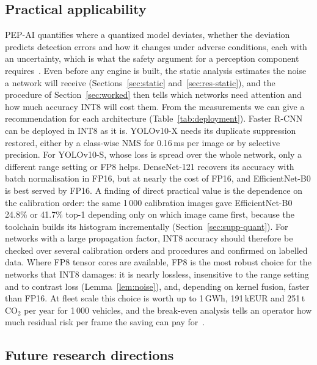 \documentclass[pdflatex,sn-mathphys-num]{sn-jnl}%
\theoremstyle{thmstyleone}%
\theoremstyle{thmstyletwo}%
\theoremstyle{thmstylethree}%
\begin{document}
\subsection{Practical applicability}

PEP-AI quantifies where a quantized model deviates, whether the deviation predicts detection errors and how it changes under adverse conditions, each with an uncertainty, which is what the safety argument for a perception component requires~\cite{iso21448,iso8800}. Even before any engine is built, the static analysis estimates the noise a network will receive (Sections~\ref{sec:static} and~\ref{sec:res-static}), and the procedure of Section~\ref{sec:worked} then tells which networks need attention and how much accuracy INT8 will cost them. From the measurements we can give a recommendation for each architecture (Table~\ref{tab:deployment}). Faster R-CNN can be deployed in INT8 as it is. YOLOv10-X needs its duplicate suppression restored, either by a class-wise NMS for 0.16\,ms per image or by selective precision. For YOLOv10-S, whose loss is spread over the whole network, only a different range setting or FP8 helps. DenseNet-121 recovers its accuracy with batch normalisation in FP16, but at nearly the cost of FP16, and EfficientNet-B0 is best served by FP16. A finding of direct practical value is the dependence on the calibration order: the same 1\,000 calibration images gave EfficientNet-B0 24.8\% or 41.7\% top-1 depending only on which image came first, because the toolchain builds its histogram incrementally (Section~\ref{sec:supp-quant}). For networks with a large propagation factor, INT8 accuracy should therefore be checked over several calibration orders and procedures and confirmed on labelled data. Where FP8 tensor cores are available, FP8 is the most robust choice for the networks that INT8 damages: it is nearly lossless, insensitive to the range setting and to contrast loss (Lemma~\ref{lem:noise}), and, depending on kernel fusion, faster than FP16. At fleet scale this choice is worth up to 1\,GWh, 191\,kEUR and 251\,t CO$_2$ per year for 1\,000 vehicles, and the break-even analysis tells an operator how much residual risk per frame the saving can pay for~\cite{sudhakar2023datacenters,ec2019greendeal}.

\subsection{Future research directions}
\end{document}
